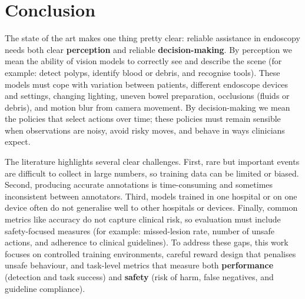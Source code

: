 








\section*{Conclusion}
The state of the art makes one thing pretty clear: reliable assistance in endoscopy
needs both clear \textbf{perception} and reliable \textbf{decision-making}. By
perception we mean the ability of vision models to correctly see and describe the
scene (for example: detect polyps, identify blood or debris, and recognise tools).
These models must cope with variation between patients, different endoscope devices
and settings, changing lighting, uneven bowel preparation, occlusions (fluids or
debris), and motion blur from camera movement. By decision-making we mean the
policies that select actions over time; these policies must remain sensible when
observations are noisy, avoid risky moves, and behave in ways clinicians expect.

The literature highlights several clear challenges. First, rare but important events
are difficult to collect in large numbers, so training data can be limited or biased.
Second, producing accurate annotations is time-consuming and sometimes inconsistent
between annotators. Third, models trained in one hospital or on one device often do
not generalise well to other hospitals or devices. Finally, common metrics like
accuracy do not capture clinical risk, so evaluation must include safety-focused
measures (for example: missed-lesion rate, number of unsafe actions, and adherence
to clinical guidelines). To address these gaps, this work focuses on controlled
training environments, careful reward design that penalises unsafe behaviour, and
task-level metrics that measure both \textbf{performance} (detection and task success)
and \textbf{safety} (risk of harm, false negatives, and guideline compliance).
